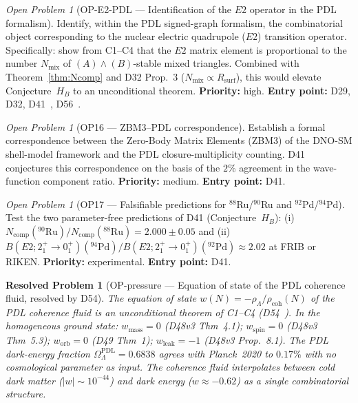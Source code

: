 \documentclass[11pt,a4paper]{article}
\newtheorem{resolvedproblem}{Resolved Problem}
\theoremstyle{plain}
\theoremstyle{definition}
\theoremstyle{remark}
\newtheorem{openproblem}[theorem]{Open Problem}
\newcommand{\rhocoh}{\rho_{\mathrm{coh}}}
\begin{document}
\begin{openproblem}[OP-E2-PDL --- Identification of the $E2$ operator in the PDL formalism]
\label{op:E2PDL}
Identify, within the PDL signed-graph formalism, the combinatorial object corresponding to the nuclear electric quadrupole ($E2$) transition operator. Specifically: show from C1--C4 that the $E2$ matrix element is proportional to the number $N_{\mathrm{mix}}$ of $(A)\wedge(B)$-stable mixed triangles. Combined with Theorem~\ref{thm:Ncomp} and D32 Prop.~3 ($N_{\mathrm{mix}}\propto R_{\mathrm{surf}}$), this would elevate Conjecture~$H_B$ to an unconditional theorem. \textbf{Priority:} high. \textbf{Entry point:} D29, D32, D41~\cite{D41}, D56~\cite{D56}.
\end{openproblem}

\begin{openproblem}[OP16 --- ZBM3--PDL correspondence]
\label{op:ZBM3}
Establish a formal correspondence between the Zero-Body Matrix Elements (ZBM3) of the DNO-SM shell-model framework and the PDL closure-multiplicity counting. D41 conjectures this correspondence on the basis of the $2\%$ agreement in the wave-function component ratio. \textbf{Priority:} medium. \textbf{Entry point:} D41.
\end{openproblem}

\begin{openproblem}[OP17 --- Falsifiable predictions for $^{88}$Ru/$^{90}$Ru and $^{92}$Pd/$^{94}$Pd]
\label{op:FRIB}
Test the two parameter-free predictions of D41 (Conjecture~$H_B$): (i) $N_{\mathrm{comp}}(^{90}\mathrm{Ru})/N_{\mathrm{comp}}(^{88}\mathrm{Ru})=2.000\pm0.05$ and (ii) $B(E2;2^+_1\!\to\!0^+_1)(^{94}\mathrm{Pd})/B(E2;2^+_1\!\to\!0^+_1)(^{92}\mathrm{Pd})\approx 2.02$ at FRIB or RIKEN. \textbf{Priority:} experimental. \textbf{Entry point:} D41.
\end{openproblem}

\begin{resolvedproblem}[OP-pressure --- Equation of state of the PDL coherence fluid, resolved by D54]
\label{op:pressure}
The equation of state $w(N) = -\rho_\Lambda/\rhocoh(N)$ of the PDL coherence fluid is an unconditional theorem of C1--C4 (D54~\cite{D54}). In the homogeneous ground state: $w_{\mathrm{mass}} = 0$ (D48v3 Thm~4.1); $w_{\mathrm{spin}} = 0$ (D48v3 Thm~5.3); $w_{\mathrm{orb}} = 0$ (D49 Thm~1); $w_{\mathrm{leak}} = -1$ (D48v3 Prop.~8.1). The PDL dark-energy fraction $\Omega_\Lambda^{\mathrm{PDL}} = 0.6838$ agrees with Planck~2020 to $0.17\%$ with no cosmological parameter as input. The coherence fluid interpolates between cold dark matter ($|w| \sim 10^{-44}$) and dark energy ($w \approx -0.62$) as a single combinatorial structure.
\end{resolvedproblem}
\end{document}
